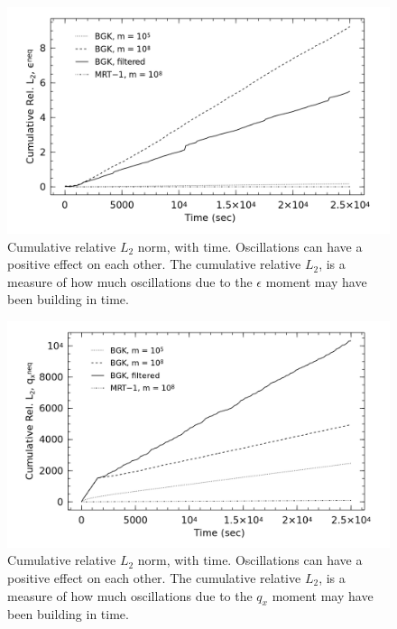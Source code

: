 \begin{figure}
    \includegraphics[width=\linewidth]{figs/poise-bingham/epsilon_cumulative}
    \caption{Cumulative relative $L_2$ norm, \DIFdelbeginFL {}\DIFdelendFL \DIFaddbeginFL {}\DIFaddendFL with time. Oscillations can have a positive effect on each other. The cumulative relative $L_2$, \DIFdelbeginFL {}\DIFdelendFL \DIFaddbeginFL {}\DIFaddendFL is a measure of how much oscillations due to the $\epsilon$ moment may have been building in time.}
    \label{fig:epsilon-cumulative}
\end{figure}

\begin{figure}
    \includegraphics[width=\linewidth]{figs/poise-bingham/qx_cumulative}
    \caption{Cumulative relative $L_2$ norm, \DIFdelbeginFL {}\DIFdelendFL \DIFaddbeginFL {}\DIFaddendFL with time. Oscillations can have a positive effect on each other. The cumulative relative $L_2$, \DIFdelbeginFL {}\DIFdelendFL \DIFaddbeginFL {}\DIFaddendFL is a measure of how much oscillations due to the $q_x$ moment may have been building in time.}
    \label{fig:qx-cumulative}
\end{figure}

